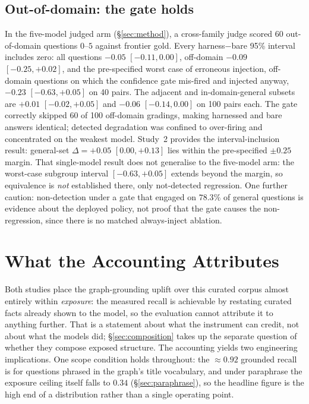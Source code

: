 \documentclass[10pt,twocolumn]{article}
\begin{document}
\subsection{Out-of-domain: the gate holds}\label{sec:ood}
In the five-model judged arm (\S\ref{sec:method}), a cross-family judge scored 60 out-of-domain questions $0$--$5$ against frontier gold. Every harness$-$bare 95\% interval includes zero: all questions $-0.05$ $[-0.11,0.00]$, off-domain $-0.09$ $[-0.25,+0.02]$, and the pre-specified worst case of erroneous injection, off-domain questions on which the confidence gate mis-fired and injected anyway, $-0.23$ $[-0.63,+0.05]$ on 40 pairs. The adjacent and in-domain-general subsets are $+0.01$ $[-0.02,+0.05]$ and $-0.06$ $[-0.14,0.00]$ on 100 pairs each. The gate correctly skipped 60 of 100 off-domain gradings, making harnessed and bare answers identical; detected degradation was confined to over-firing and concentrated on the weakest model. Study~2 provides the interval-inclusion result: general-set $\Delta=+0.05$ $[0.00,+0.13]$ lies within the pre-specified $\pm0.25$ margin. That single-model result does not generalise to the five-model arm: the worst-case subgroup interval $[-0.63,+0.05]$ extends beyond the margin, so equivalence is \emph{not} established there, only not-detected regression. One further caution: non-detection under a gate that engaged on $78.3\%$ of general questions is evidence about the deployed policy, not proof that the gate causes the non-regression, since there is no matched always-inject ablation.


\section{What the Accounting Attributes}\label{sec:analysis}
Both studies place the graph-grounding uplift over this curated corpus almost entirely within \emph{exposure}: the measured recall is achievable by restating curated facts already shown to the model, so the evaluation cannot attribute it to anything further. That is a statement about what the instrument can credit, not about what the models did; \S\ref{sec:composition} takes up the separate question of whether they compose exposed structure. The accounting yields two engineering implications. One scope condition holds throughout: the $\approx0.92$ grounded recall is for questions phrased in the graph's title vocabulary, and under paraphrase the exposure ceiling itself falls to $0.34$ (\S\ref{sec:paraphrase}), so the headline figure is the high end of a distribution rather than a single operating point.
\end{document}
